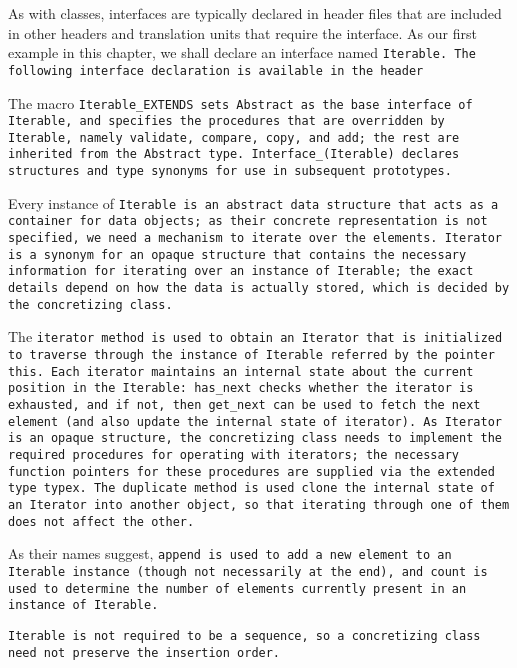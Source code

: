 \example As with classes, interfaces are typically declared in header files that
are included in other headers and translation units that require the interface.
As our first example in this chapter,
we shall declare an interface named \tt{Iterable}.
The following interface declaration is available in the header

The macro \tt{Iterable_EXTENDS} sets \tt{Abstract} as the base
interface of \tt{Iterable}, and specifies the procedures that are
overridden by \tt{Iterable}, namely \tt{validate}, \tt{compare},
\tt{copy}, and \tt{add}; the rest are inherited from the \tt{Abstract} type.
\tt{Interface_(Iterable)} declares structures and
type synonyms for use in subsequent prototypes.

\enlargethispage*{\baselineskip}
\enlargethispage*{\baselineskip}

Every instance of \tt{Iterable} is an abstract data structure that
acts as a container for data objects; as their concrete representation
is not specified, we need a mechanism to iterate over the elements.
\tt{Iterator} is a synonym for an opaque structure that contains the
necessary information for iterating over an instance of \tt{Iterable};
the exact details depend on how the data is actually stored,
which is decided by the concretizing class.

The \tt{iterator} method is used to obtain an \tt{Iterator}
that is initialized to traverse through the instance
of \tt{Iterable} referred by the pointer \tt{this}.
Each \tt{iterator} maintains an internal state about the current position in
the \tt{Iterable}: \tt{has_next} checks whether the \tt{iterator} is exhausted,
and if not, then \tt{get_next} can be used to fetch the next element
(and also update the internal state of \tt{iterator}).
As \tt{Iterator} is an opaque structure, the concretizing class needs
to implement the required procedures for operating with iterators;
the necessary function pointers for these procedures
are supplied via the extended type \tt{typex}.
The \tt{duplicate} method is used clone the internal
state of an \tt{Iterator} into another object,
so that iterating through one of them does not affect the other.

As their names suggest, \tt{append} is used to add a new element
to an \tt{Iterable} instance (though not necessarily at the end),
and \tt{count} is used to determine the number of elements
currently present in an instance of \tt{Iterable}.

\note \tt{Iterable} is not required to be a sequence,
so a concretizing class need not preserve the insertion order.
